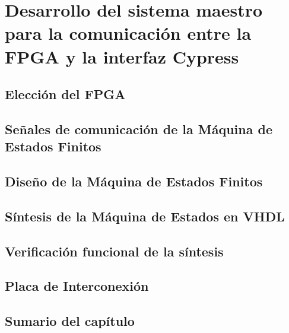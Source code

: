 \chapter{Desarrollo del sistema maestro para la comunicación entre la FPGA y la interfaz Cypress}
	\label{cap:fpga}
	
%		
	\section{Elección del FPGA}
		\label{mats:fpga}
		
	\section{Señales de comunicación de la Máquina de Estados Finitos}
		\label{fpga:sigs}
		
	\section{Diseño de la Máquina de Estados Finitos}
		
	\section{Síntesis de la Máquina de Estados en VHDL}
		
	\section{Verificación funcional de la síntesis}
		
	\section{Placa de Interconexión}
		
	\section{Sumario del capítulo}
		